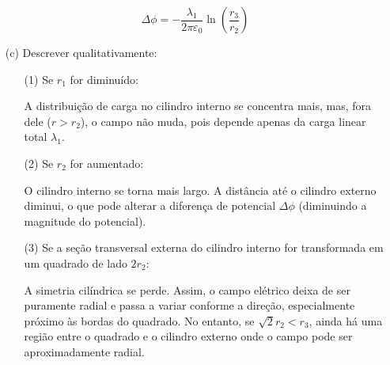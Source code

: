 \documentclass[a4paper,12pt]{article}
\begin{document}
\begin{flushleft}
\begin{itemize}
    \[
    \Delta \phi = -\frac{\lambda_1}{2\pi\varepsilon_0} \ln\left(\frac{r_3}{r_2}\right)
    \]

    \item[(c)] Descrever qualitativamente:

    \begin{itemize}
        \item[(1)] Se $r_1$ for diminuído:

        A distribuição de carga no cilindro interno se concentra mais, mas, fora dele ($r > r_2$), o campo não muda, pois depende apenas da carga linear total $\lambda_1$.

        \item[(2)] Se $r_2$ for aumentado:

        O cilindro interno se torna mais largo. A distância até o cilindro externo diminui, o que pode alterar a diferença de potencial $\Delta \phi$ (diminuindo a magnitude do potencial).

        \item[(3)] Se a seção transversal externa do cilindro interno for transformada em um quadrado de lado $2r_2$:

        A simetria cilíndrica se perde. Assim, o campo elétrico deixa de ser puramente radial e passa a variar conforme a direção, especialmente próximo às bordas do quadrado. No entanto, se $\sqrt{2} r_2 < r_3$, ainda há uma região entre o quadrado e o cilindro externo onde o campo pode ser aproximadamente radial.
    \end{itemize}

\end{itemize}

\end{flushleft}
\end{document}
